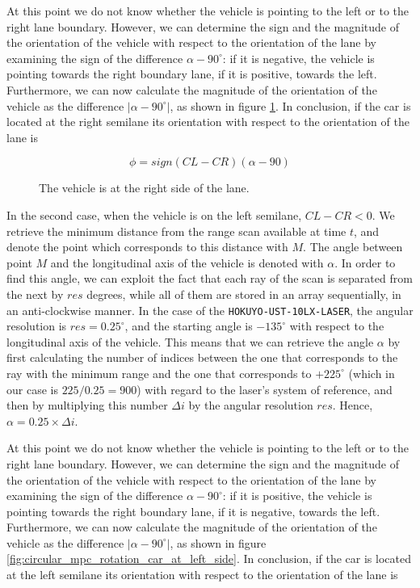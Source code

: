 At this point we do not know whether the vehicle is pointing to the
left or to the right lane boundary. However, we can determine the sign and the
magnitude of the orientation of the vehicle with respect to the orientation of
the lane by examining the sign of the difference $\alpha - 90^{\circ}$:
if it is negative, the vehicle is pointing towards the right boundary lane,
if it is positive, towards the left. Furthermore, we can now
calculate the magnitude of the orientation of the vehicle as the difference
$|\alpha - 90^{\circ}|$, as shown in figure \ref{fig:circular_mpc_rotation_car_at_right_side}.
In conclusion, if the car is located at the right semilane its orientation with
respect to the orientation of the lane is

$$\phi = sign(CL-CR)(\alpha - 90)$$


\begin{figure}[H]\centering
  \scalebox{1}{}
  \caption{The vehicle is at the right side of the lane.}
  \label{fig:circular_mpc_rotation_car_at_right_side}
\end{figure}

In the second case, when the vehicle is on the left semilane, $CL-CR < 0$.
We retrieve the minimum distance from the range scan available at time $t$,
and denote the point which corresponds to this distance with $M$. The angle
between point $M$ and the longitudinal axis of the vehicle is denoted with
$\alpha$. In order to find this angle, we can exploit the fact that each ray
of the scan is separated from the next by $res$ degrees, while all of them
are stored in an array sequentially, in an anti-clockwise manner. In the case
of the \texttt{HOKUYO-UST-10LX-LASER}, the angular resolution is
$res=0.25^{\circ}$, and the starting angle is $-135^{\circ}$ with respect to the
longitudinal axis of the vehicle. This means that we can retrieve the angle
$\alpha$ by first calculating the number of indices between the one that
corresponds to the ray with the minimum range and the one that corresponds
to $+225^{\circ}$ (which in our case is $225 / 0.25 = 900$) with regard to
the laser's system of reference, and then by multiplying this number
$\Delta i$ by the angular resolution $res$. Hence,
$\alpha = 0.25 \times \Delta i$.

At this point we do not know whether the vehicle is pointing to the
left or to the right lane boundary. However, we can determine the sign and the
magnitude of the orientation of the vehicle with respect to the orientation of
the lane by examining the sign of the difference $\alpha - 90^{\circ}$:
if it is positive, the vehicle is pointing towards the right boundary lane,
if it is negative, towards the left. Furthermore, we can now
calculate the magnitude of the orientation of the vehicle as the difference
$|\alpha - 90^{\circ}|$, as shown in figure \ref{fig:circular_mpc_rotation_car_at_left_side}.
In conclusion, if the car is located at the left semilane its orientation with
respect to the orientation of the lane is

